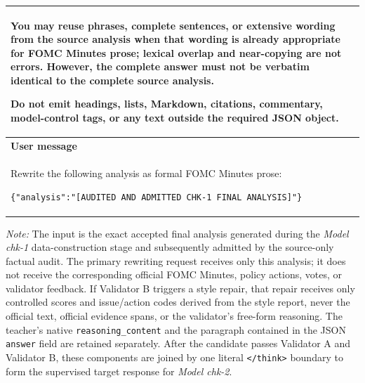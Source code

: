 \begin{table}[htbp]
\begin{threeparttable}
\begin{tabular}{@{}p{}@{}}
        You may reuse phrases, complete sentences, or extensive wording from
        the source analysis when that wording is already appropriate for FOMC
        Minutes prose; lexical overlap and near-copying are not errors.
        However, the complete answer must not be verbatim identical to the
        complete source analysis.
        \par\medskip

        Do not emit headings, lists, Markdown, citations, commentary,
        model-control tags, or any text outside the required JSON object.
        \\[6pt]

        \midrule

        \textbf{User message} \\[2pt]

        Rewrite the following analysis as formal FOMC Minutes prose:
        \par\medskip

        \texttt{\{"analysis":"[AUDITED AND ADMITTED CHK-1 FINAL
        ANALYSIS]"\}}
        \\

        \bottomrule
    \end{tabular}

    \begin{tablenotes}[flushleft]
        \scriptsize
        \item \textit{Note:} The input is the exact accepted final analysis
        generated during the \textit{Model chk-1} data-construction stage and
        subsequently admitted by the source-only factual audit. The primary
        rewriting request receives only this analysis; it does not receive the
        corresponding official FOMC Minutes, policy actions, votes, or
        validator feedback. If Validator B triggers a style repair, that repair
        receives only controlled scores and issue/action codes derived from the
        style report, never the official text, official evidence spans, or the
        validator's free-form reasoning. The teacher's native
        \texttt{reasoning\_content} and the paragraph contained in the JSON
        \texttt{answer} field are retained separately. After the candidate
        passes Validator A and Validator B, these components are joined by one
        literal \texttt{</think>} boundary to form the supervised target
        response for \textit{Model chk-2}.
    \end{tablenotes}
    \end{threeparttable}
\end{table}


